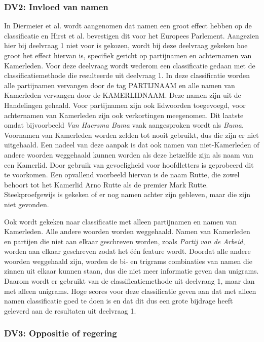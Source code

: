 \subsubsection{DV2: Invloed van namen}
In Diermeier et al. \cite{diermeier_godbout_yu_kaufmann_2012} wordt aangenomen dat namen een groot effect hebben op de classificatie en Hirst et al. \cite{Hirst_textto} bevestigen dit voor het Europees Parlement. Aangezien hier bij deelvraag 1 niet voor is gekozen, wordt bij deze deelvraag gekeken hoe groot het effect hiervan is, specifiek gericht op partijnamen en achternamen van Kamerleden. Voor deze deelvraag wordt wederom een classificatie gedaan met de classificatiemethode die resulteerde uit deelvraag 1. In deze classificatie worden alle partijnamen vervangen door de tag PARTIJNAAM en alle namen van Kamerleden vervangen door de KAMERLIDNAAM. Deze namen zijn uit de Handelingen gehaald. Voor partijnamen zijn ook lidwoorden toegevoegd, voor achternamen van Kamerleden zijn ook verkortingen meegenomen. Dit laatste omdat bijvoorbeeld \textit{Van Haersma Buma} vaak aangesproken wordt als \textit{Buma}. Voornamen van Kamerleden worden zelden tot nooit gebruikt, dus die zijn er niet uitgehaald. Een nadeel van deze aanpak is dat ook namen van niet-Kamerleden of andere woorden weggehaald kunnen worden als deze hetzelfde zijn als naam van een Kamerlid. Door gebruik van gevoeligheid voor hoofdletters is geprobeerd dit te voorkomen. Een opvallend voorbeeld hiervan is de naam Rutte, die zowel behoort tot het Kamerlid Arno Rutte als de premier Mark Rutte. Steekproefgewijs is gekeken of er nog namen achter zijn gebleven, maar die zijn niet gevonden. \par
Ook wordt gekeken naar classificatie met alleen partijnamen en namen van Kamerleden. Alle andere woorden worden weggehaald. Namen van Kamerleden en partijen die niet aan elkaar geschreven worden, zoals \textit{Partij van de Arbeid}, worden aan elkaar geschreven zodat het één feature wordt. Doordat alle andere woorden weggehaald zijn, worden de bi- en trigrams combinaties van namen die zinnen uit elkaar kunnen staan, dus die niet meer informatie geven dan unigrams. Daarom wordt er gebruikt van de classificatiemethode uit deelvraag 1, maar dan met alleen unigrams. Hoge scores voor deze classificatie geven aan dat met alleen namen classificatie goed te doen is en dat dit dus een grote bijdrage heeft geleverd aan de resultaten uit deelvraag 1. \par

\subsubsection{DV3: Oppositie of regering}

